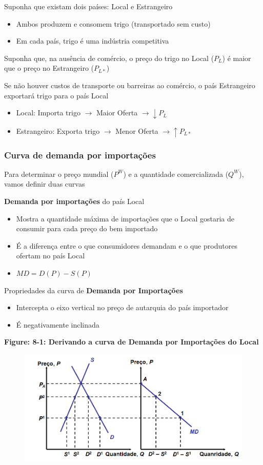 \documentclass[a4paper,12pt]{article}[abntex2]
\begin{document}
Suponha que existam dois países: Local e Estrangeiro
\begin{itemize}
  \item Ambos produzem e consomem trigo (transportado sem custo)
  \item Em cada país, trigo é uma indústria competitiva
\end{itemize}

Suponha que, na ausência de comércio, o preço do trigo no Local ($P_L$) é maior que o preço no Estrangeiro ($P_{L*}$)

Se não houver custos de transporte ou barreiras ao comércio, o país Estrangeiro exportará trigo para o país Local
\begin{itemize}
  \item Local: Importa trigo $\rightarrow$ Maior Oferta $\rightarrow \downarrow P_L$
  \item Estrangeiro: Exporta trigo $\rightarrow$ Menor Oferta $\rightarrow \uparrow P_{L*}$
\end{itemize}

\subsubsection{\textbf{Curva de demanda por importações}}
Para determinar o preço mundial ($P^W$) e a quantidade comercializada ($Q^W$), vamos definir duas curvas

\textbf{Demanda por importações} do país Local
\begin{itemize}
  \item Mostra a quantidade máxima de importações que o Local gostaria de consumir para cada preço do bem importado
  \item É a diferença entre o que consumidores demandam e o que produtores ofertam no país Local
  \item $MD = D(P) - S(P)$
\end{itemize}

Propriedades da curva de \textbf{Demanda por Importações}
\begin{itemize}
  \item Intercepta o eixo vertical no preço de autarquia do país importador
  \item É negativamente inclinada
\end{itemize}

\textbf{Figure: 8-1: Derivando a curva de Demanda por Importações do Local}

\begin{figure}[H]
    \centering
    \includegraphics[width=0.7\linewidth]{Imagens/a19i4.png}
\end{figure}
\end{document}
